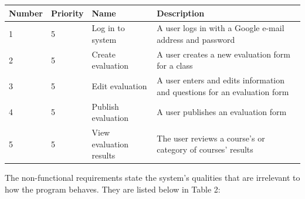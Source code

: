 \documentclass{article}
\begin{document}
\begin{center}
\begin{tabular}{|p{1.5cm}|p{1.5cm}|p{3.5cm}|p{6cm}|} 
\hline
\textbf{Number} & \textbf{Priority} & \textbf{Name} & \textbf{Description} \\
\hline
1 & 5 & Log in to system & A user logs in with a Google e-mail address and password \\ 
\hline
2 & 5 & Create evaluation & A user creates a new evaluation form for a class \\ 
\hline
3 & 5 & Edit evaluation & A user enters and edits information and questions for an evaluation form \\  
\hline
4 & 5 & Publish evaluation & A user publishes an evaluation form \\
\hline
5 & 5 & View evaluation results & The user reviews a course's or category of courses' results \\ 
\hline

\end{tabular}
\end{center}

The non-functional requirements state the system's qualities that are irrelevant to how the program behaves. They are listed below in Table 2:
\end{document}
